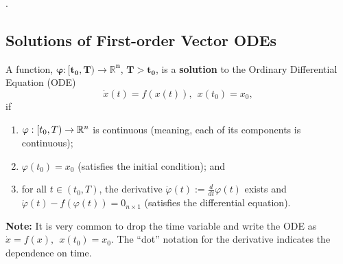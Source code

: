 \Qed.

\bigskip




\subsection{Solutions of First-order Vector ODEs}

\begin{tcolorbox}[colback=mylightblue, title = {\bf What is a Solution?}, breakable]
\begin{definition}
\label{def:ODEsolution}
 A function,  $\bm{\varphi:[t_0, T) \to \mathbb{R}^n}$, $\bm{T > t_0}$, is a \textbf{solution} to the Ordinary Differential Equation (ODE) 
\begin{equation}
    \dot{x}(t) = f(x(t)), ~~x(t_0) = x_0,
\end{equation}
if 
 \begin{enumerate}
\renewcommand{\labelenumi}{(\alph{enumi})}
\setlength{\itemsep}{.2cm}
    \item $\varphi:[t_0, T) \to \mathbb R^n$ is continuous (meaning, each of its components is continuous);
    \item  $\varphi(t_0) = x_0$ (satisfies the initial condition); and
    \item for all $t \in (t_0, T)$, the derivative $\dot{\varphi}(t):=\frac{d}{dt} \varphi(t)$ exists and $\dot{\varphi}(t) - f(\varphi(t)) = 0_{n\times 1}$ (satisfies the differential equation).
\end{enumerate}
\end{definition}
\bigskip
\textbf{Note:} It is very common to drop the time variable and write the ODE as $\dot{x} = f(x), ~~x(t_0) = x_0$. The ``dot'' notation for the derivative indicates the dependence on time. 

\end{tcolorbox}

\bigskip

